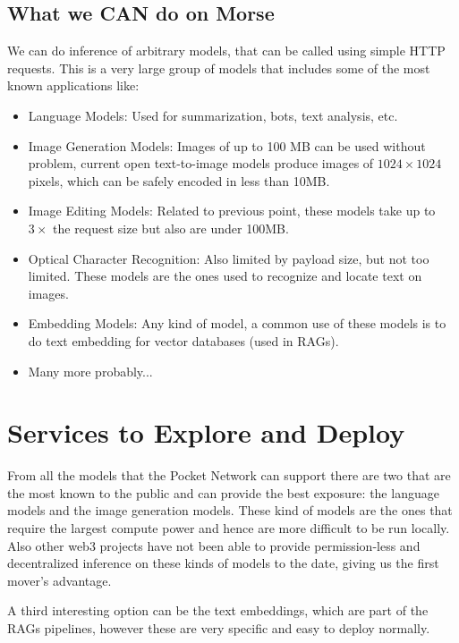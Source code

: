 \subsection{What we CAN do on Morse}
We can do inference of arbitrary models, that can be called using simple HTTP requests. This is a very large group of models that includes some of the most known applications like:
\begin{itemize}
    \item Language Models: Used for summarization, bots, text analysis, etc.
    \item Image Generation Models: Images of up to 100 MB can be used without problem, current open text-to-image models produce images of $1024\times1024$ pixels, which can be safely encoded in less than 10MB.
    \item Image Editing Models: Related to previous point, these models take up to $3\times$ the request size but also are under 100MB.
    \item Optical Character Recognition: Also limited by payload size, but not too limited. These models are the ones used to recognize and locate text on images.
    \item Embedding Models: Any kind of model, a common use of these models is to do text embedding for vector databases (used in RAGs).
    \item Many more probably...
\end{itemize}



\section{Services to Explore and Deploy}
From all the models that the Pocket Network can support there are two that are the most known to the public and can provide the best exposure: the language models and the image generation models. These kind of models are the ones that require the largest compute power and hence are more difficult to be run locally. Also other web3 projects have not been able to provide permission-less and decentralized inference on these kinds of models to the date, giving us the first mover's advantage.

A third interesting option can be the text embeddings, which are part of the RAGs pipelines, however these are very specific and easy to deploy normally.

